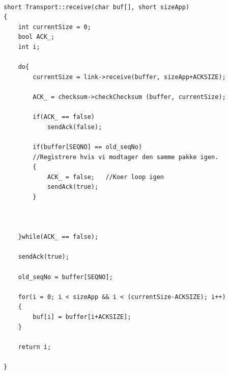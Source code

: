 \begin{lstlisting}[frame=single]  % Start your code-block

short Transport::receive(char buf[], short sizeApp)
{
    int currentSize = 0;
    bool ACK_;
    int i;

    do{
        currentSize = link->receive(buffer, sizeApp+ACKSIZE);

        ACK_ = checksum->checkChecksum (buffer, currentSize);

        if(ACK_ == false)
            sendAck(false);

        if(buffer[SEQNO] == old_seqNo)  
        //Registrere hvis vi modtager den samme pakke igen.
        {
            ACK_ = false;   //Koer loop igen
            sendAck(true);
        }



    }while(ACK_ == false);

    sendAck(true);

    old_seqNo = buffer[SEQNO];

    for(i = 0; i < sizeApp && i < (currentSize-ACKSIZE); i++)
    {
        buf[i] = buffer[i+ACKSIZE];
    }

    return i;

}

\end{lstlisting}


